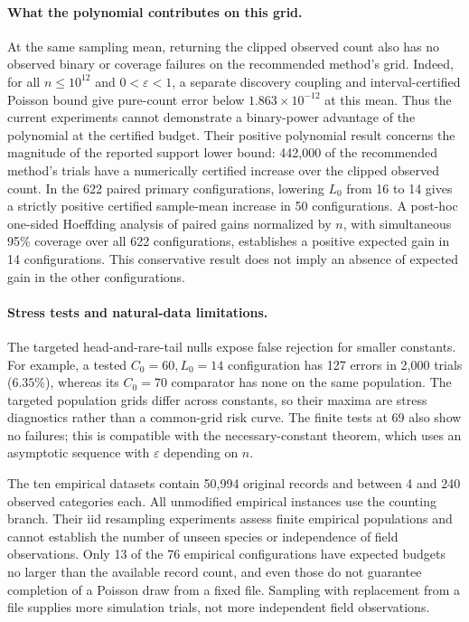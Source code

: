 \paragraph{What the polynomial contributes on this grid.}
At the same sampling mean, returning the clipped observed count also has
no observed binary or coverage failures on the recommended method's grid.
Indeed, for all $n\le10^{12}$ and $0<\varepsilon<1$, a separate discovery
coupling and interval-certified Poisson bound give pure-count error below
$1.863\times10^{-12}$ at this mean. Thus the current experiments cannot
demonstrate a binary-power advantage of the polynomial at the certified
budget. Their positive polynomial result concerns the magnitude of the
reported support lower bound: 442,000 of the recommended method's trials
have a numerically certified increase over the clipped observed count.
In the 622 paired primary configurations, lowering $L_0$ from 16 to 14
gives a strictly positive certified sample-mean increase in 50 configurations.
A post-hoc one-sided Hoeffding analysis of paired gains normalized by $n$,
with simultaneous 95\% coverage over all 622 configurations, establishes
a positive expected gain in 14 configurations. This conservative result
does not imply an absence of expected gain in the other configurations.

\paragraph{Stress tests and natural-data limitations.}
The targeted head-and-rare-tail nulls expose false rejection for smaller
constants. For example, a tested $C_0=60,L_0=14$ configuration has 127
errors in 2,000 trials ($6.35\%$), whereas its $C_0=70$ comparator has
none on the same population. The targeted population grids differ across
constants, so their maxima are stress diagnostics rather than a common-grid
risk curve. The finite tests at 69 also show no failures; this is compatible
with the necessary-constant theorem, which uses an asymptotic sequence
with $\varepsilon$ depending on $n$.

The ten empirical datasets contain 50,994 original records and between
4 and 240 observed categories each. All unmodified empirical instances
use the counting branch. Their iid resampling experiments assess finite
empirical populations and cannot establish the number of unseen species
or independence of field observations. Only 13 of the 76 empirical
configurations have expected budgets no larger than the available record
count, and even those do not guarantee completion of a Poisson draw from
a fixed file. Sampling with replacement from a file supplies more
simulation trials, not more independent field observations.

